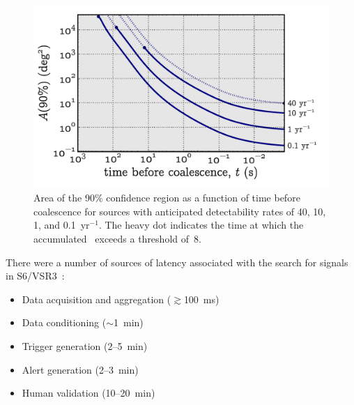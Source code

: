 \documentclass[portrait,plainboxedsections]{sciposter}
\begin{document}
\begin{minipage}[t]{0.25\textwidth}
\begin{figure}[h]
\includegraphics[width=\textwidth]{figures/loc_in_time}
\caption{\label{fig:sky-localization-accuracy}Area of the 90\% confidence
region as a function of time before coalescence for sources with anticipated
detectability rates of 40, 10, 1, and 0.1~yr$^{-1}$. The heavy dot indicates
the time at which the accumulated \SNR\ exceeds a threshold of~8.}
\end{figure}

There were a number of sources of latency associated with the search for
\CBC{} signals in S6/VSR3~\cite{HugheyGWPAW2011}:

\begin{itemize}
\item Data acquisition and aggregation ($\gtrsim$100~ms)

\item Data conditioning ($\sim$1~min)

\item Trigger generation (2--5~min)

\item Alert generation (2--3~min)

\item Human validation (10--20~min)

\end{itemize}

\end{minipage}%
\hspace{0.05\textwidth}%
\end{document}
